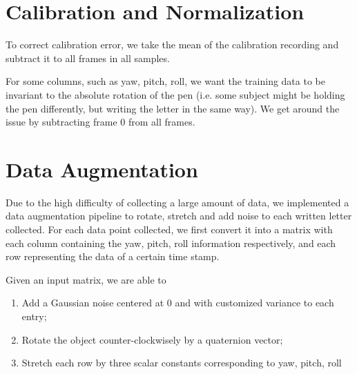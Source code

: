\documentclass{article}
\begin{document}
\section{Calibration and Normalization} \label{calibration}

To correct calibration error, we take the mean of the calibration recording and subtract it to all frames in all samples.

For some columns, such as yaw, pitch, roll, we want the training data to be invariant to the absolute rotation of the pen (i.e. some subject might be holding the pen differently, but writing the letter in the same way). We get around the issue by subtracting frame 0 from all frames.


\section{Data Augmentation} \label{data_augmentation}

Due to the high difficulty of collecting a large amount of data, we implemented a data augmentation pipeline to rotate, stretch and add noise to each written letter collected. For each data point collected, we first convert it into a matrix with each column containing the yaw, pitch, roll information respectively, and each row representing the data of a certain time stamp.

Given an input matrix, we are able to 

\begin{enumerate}[nolistsep]
    \item Add a Gaussian noise centered at 0 and with customized variance to each entry;
    \item Rotate the object counter-clockwisely by a quaternion vector;
    \item Stretch each row by three scalar constants corresponding to yaw, pitch, roll
\end{enumerate}
\end{document}
